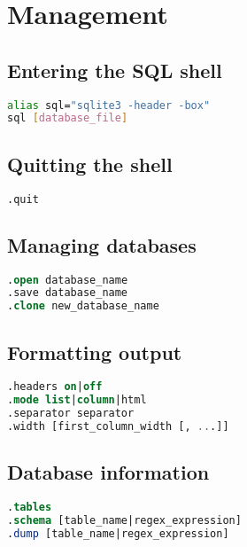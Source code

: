 \documentclass{hibiscus}
\begin{document}
\maketitle
\tableofcontents


\section{Management}

\subsection{Entering the SQL shell}

\begin{lstlisting}[language=bash]
alias sql="sqlite3 -header -box"
sql [database_file]
\end{lstlisting}

\subsection{Quitting the shell}

\begin{lstlisting}[language=SQL]
.quit
\end{lstlisting}

\subsection{Managing databases}

\begin{lstlisting}[language=SQL]
.open database_name
.save database_name
.clone new_database_name
\end{lstlisting}

\subsection{Formatting output}

\begin{lstlisting}[language=SQL]
.headers on|off
.mode list|column|html
.separator separator
.width [first_column_width [, ...]]
\end{lstlisting}

\subsection{Database information}

\begin{lstlisting}[language=SQL]
.tables
.schema [table_name|regex_expression]
.dump [table_name|regex_expression]
\end{lstlisting}
\end{document}
